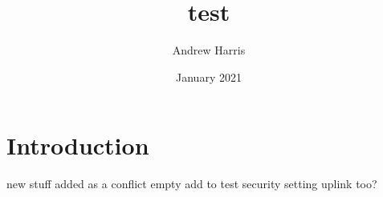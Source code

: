\documentclass{article}
\title{test}
\author{Andrew Harris}
\date{January 2021}
\begin{document}
\maketitle

\section{Introduction}
new stuff added as a conflict 
empty
add to test security setting
uplink too?
\end{document}
